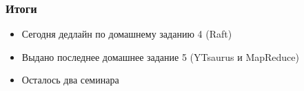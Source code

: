 \documentclass{beamer}
\begin{document}



\begin{frame}
\frametitle{Итоги}

\begin{itemize}
    \item Сегодня дедлайн по домашнему заданию 4 (Raft)
    \item Выдано последнее домашнее задание 5 (YTsaurus и MapReduce)
    \item Осталось два семинара
\end{itemize}

\end{frame}
\end{document}
